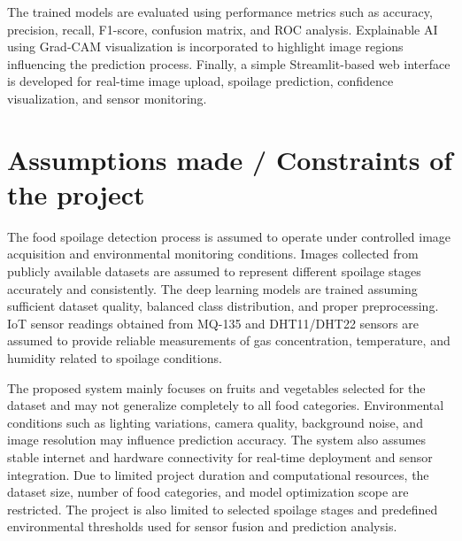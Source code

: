 The trained models are evaluated using performance metrics such as accuracy, precision, recall, F1-score, confusion matrix, and ROC analysis. Explainable AI using Grad-CAM visualization is incorporated to highlight image regions influencing the prediction process. Finally, a simple Streamlit-based web interface is developed for real-time image upload, spoilage prediction, confidence visualization, and sensor monitoring.

\section[Assumptions made / Constraints of the project]{\textbf{Assumptions made / Constraints of the project}}
The food spoilage detection process is assumed to operate under controlled image acquisition and environmental monitoring conditions. Images collected from publicly available datasets are assumed to represent different spoilage stages accurately and consistently. The deep learning models are trained assuming sufficient dataset quality, balanced class distribution, and proper preprocessing. IoT sensor readings obtained from MQ-135 and DHT11/DHT22 sensors are assumed to provide reliable measurements of gas concentration, temperature, and humidity related to spoilage conditions.

The proposed system mainly focuses on fruits and vegetables selected for the dataset and may not generalize completely to all food categories. Environmental conditions such as lighting variations, camera quality, background noise, and image resolution may influence prediction accuracy. The system also assumes stable internet and hardware connectivity for real-time deployment and sensor integration. Due to limited project duration and computational resources, the dataset size, number of food categories, and model optimization scope are restricted. The project is also limited to selected spoilage stages and predefined environmental thresholds used for sensor fusion and prediction analysis.